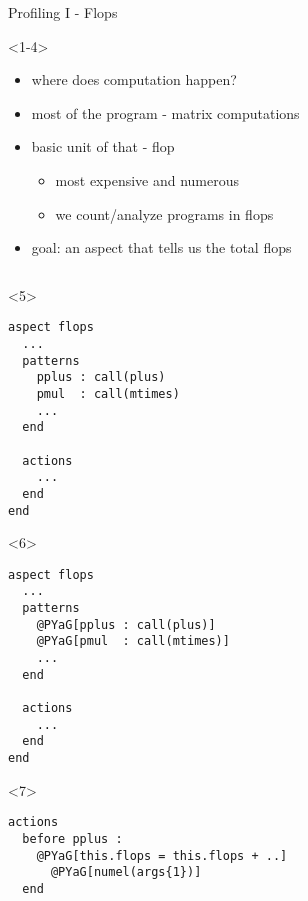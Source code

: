 \begin{frame}[fragile]{Profiling I - Flops}
  \begin{onlyenv}<1-4>
    \vspace{4ex}
    \begin{itemize}
    \item where does computation happen?
    \pause \item most of the program - matrix computations
    \pause \item basic unit of that - flop
      \begin{itemize}
      \item most expensive and numerous
      \item we count/analyze programs in flops
      \end{itemize}
    \pause \item goal: an aspect that tells us the total flops
    \end{itemize}
  \end{onlyenv}
    \begin{columns}
      \begin{column}[T]{5cm}
        \begin{onlyenv}<5>
          \begin{Verbatim}[commandchars=@\[\]]
aspect flops
  ...
  patterns
    pplus : call(plus)
    pmul  : call(mtimes)
    ...
  end

  actions
    ...
  end
end
        \end{Verbatim}
      \end{onlyenv}
        \begin{onlyenv}<6>
          \begin{Verbatim}[commandchars=@\[\]]
aspect flops
  ...
  patterns
    @PYaG[pplus : call(plus)]
    @PYaG[pmul  : call(mtimes)]
    ...
  end

  actions
    ...
  end
end
        \end{Verbatim}
      \end{onlyenv}
        \begin{onlyenv}<7>
          \begin{Verbatim}[commandchars=@\[\]]
actions
  before pplus : 
    @PYaG[this.flops = this.flops + ..]
      @PYaG[numel(args{1})]
  end
        

\end{Verbatim}
\end{onlyenv}
\end{column}
\end{columns}
\end{frame}
